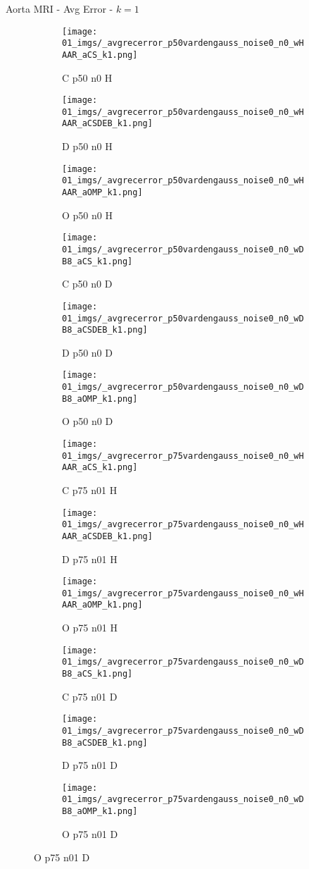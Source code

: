 \begin{frame}{Aorta MRI - Avg Error - $k=1$}{}
\begin{figure}
\begin{subfigure}{0.13\textwidth}
\texttt{[image: 01\_imgs/\_avgrecerror\_p50vardengauss\_noise0\_n0\_wHAAR\_aCS\_k1.png]}
\caption*{\tiny C p50 n0 H}
\end{subfigure}
\begin{subfigure}{0.13\textwidth}
\texttt{[image: 01\_imgs/\_avgrecerror\_p50vardengauss\_noise0\_n0\_wHAAR\_aCSDEB\_k1.png]}
\caption*{\tiny D p50 n0 H}
\end{subfigure}
\begin{subfigure}{0.13\textwidth}
\texttt{[image: 01\_imgs/\_avgrecerror\_p50vardengauss\_noise0\_n0\_wHAAR\_aOMP\_k1.png]}
\caption*{\tiny O p50 n0 H}
\end{subfigure}
\begin{subfigure}{0.13\textwidth}
\texttt{[image: 01\_imgs/\_avgrecerror\_p50vardengauss\_noise0\_n0\_wDB8\_aCS\_k1.png]}
\caption*{\tiny C p50 n0 D}
\end{subfigure}
\begin{subfigure}{0.13\textwidth}
\texttt{[image: 01\_imgs/\_avgrecerror\_p50vardengauss\_noise0\_n0\_wDB8\_aCSDEB\_k1.png]}
\caption*{\tiny D p50 n0 D}
\end{subfigure}
\begin{subfigure}{0.13\textwidth}
\texttt{[image: 01\_imgs/\_avgrecerror\_p50vardengauss\_noise0\_n0\_wDB8\_aOMP\_k1.png]}
\caption*{\tiny O p50 n0 D}
\end{subfigure}

\vspace{5pt}

\begin{subfigure}{0.13\textwidth}
\texttt{[image: 01\_imgs/\_avgrecerror\_p75vardengauss\_noise0\_n0\_wHAAR\_aCS\_k1.png]}
\caption*{\tiny C p75 n01 H}
\end{subfigure}
\begin{subfigure}{0.13\textwidth}
\texttt{[image: 01\_imgs/\_avgrecerror\_p75vardengauss\_noise0\_n0\_wHAAR\_aCSDEB\_k1.png]}
\caption*{\tiny D p75 n01 H}
\end{subfigure}
\begin{subfigure}{0.13\textwidth}
\texttt{[image: 01\_imgs/\_avgrecerror\_p75vardengauss\_noise0\_n0\_wHAAR\_aOMP\_k1.png]}
\caption*{\tiny O p75 n01 H}
\end{subfigure}
\begin{subfigure}{0.13\textwidth}
\texttt{[image: 01\_imgs/\_avgrecerror\_p75vardengauss\_noise0\_n0\_wDB8\_aCS\_k1.png]}
\caption*{\tiny C p75 n01 D}
\end{subfigure}
\begin{subfigure}{0.13\textwidth}
\texttt{[image: 01\_imgs/\_avgrecerror\_p75vardengauss\_noise0\_n0\_wDB8\_aCSDEB\_k1.png]}
\caption*{\tiny D p75 n01 D}
\end{subfigure}
\begin{subfigure}{0.13\textwidth}
\texttt{[image: 01\_imgs/\_avgrecerror\_p75vardengauss\_noise0\_n0\_wDB8\_aOMP\_k1.png]}
\caption*{\tiny O p75 n01 D}
\end{subfigure}


\end{figure}
\end{frame}
